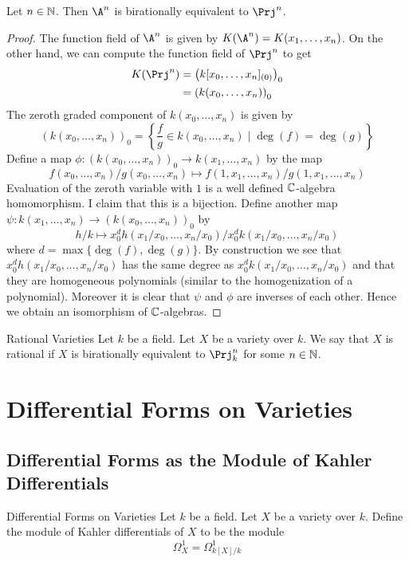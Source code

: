 \documentclass[a4paper]{article}
\begin{document}
\begin{lmm}{}{} Let $n\in\mathbb{N}$. Then $\A^n$ is birationally equivalent to $\Prj^n$. 
\begin{proof}
The function field of $\A^n$ is given by $K(\A^n)=K(x_1,\dots,x_n)$. On the other hand, we can compute the function field of $\Prj^n$ to get 
\begin{align*}
K(\Prj^n)&=\left(k[x_0,\dots,x_n]_{(0)}\right)_0\\
&=\left(k(x_0,\dots,x_n)\right)_0
\end{align*}
The zeroth graded component of $k(x_0,\dots,x_n)$ is given by $$(k(x_0,\dots,x_n))_0=\left\{\frac{f}{g}\in k(x_0,\dots,x_n)\;|\;\deg(f)=\deg(g)\right\}$$ Define a map $\phi:(k(x_0,\dots,x_n))_0\to k(x_1,\dots,x_n)$ by the map $$f(x_0,\dots,x_n)/g(x_0,\dots,x_n)\mapsto f(1,x_1,\dots,x_n)/g(1,x_1,\dots,x_n)$$ Evaluation of the zeroth variable with $1$ is a well defined $\mathbb{C}$-algebra homomorphism. I claim that this is a bijection. Define another map $\psi:k(x_1,\dots,x_n)\to(k(x_0,\dots,x_n))_0$ by $$h/k\mapsto x_0^d h(x_1/x_0,\dots,x_n/x_0)/x_0^d k(x_1/x_0,\dots,x_n/x_0)$$ where $d=\max\{\deg(f),\deg(g)\}$. By construction we see that $x_0^d h(x_1/x_0,\dots,x_n/x_0)$ has the same degree as $x_0^d k(x_1/x_0,\dots,x_n/x_0)$ and that they are homogeneous polynomials (similar to the homogenization of a polynomial). Moreover it is clear that $\psi$ and $\phi$ are inverses of each other. Hence we obtain an isomorphism of $\mathbb{C}$-algebras. 
\end{proof}
\end{lmm}

\begin{defn}{Rational Varieties}{} Let $k$ be a field. Let $X$ be a variety over $k$. We say that $X$ is rational if $X$ is birationally equivalent to $\Prj_k^n$ for some $n\in\mathbb{N}$. 
\end{defn}

\pagebreak
\section{Differential Forms on Varieties}
\subsection{Differential Forms as the Module of Kahler Differentials}
\begin{defn}{Differential Forms on Varieties}{} Let $k$ be a field. Let $X$ be a variety over $k$. Define the module of Kahler differentials of $X$ to be the module $$\Omega_X^1=\Omega_{k[X]/k}^1$$
\end{defn}
\end{document}
